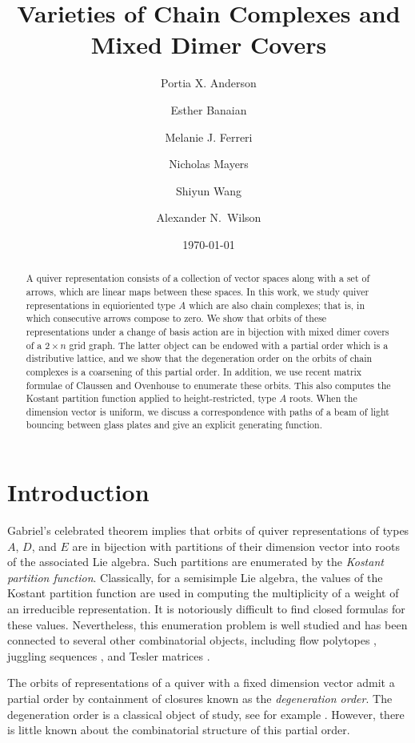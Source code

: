 \documentclass{amsart}
\title{Varieties of Chain Complexes and Mixed Dimer Covers}
\author{}
\date{\today}
\author[Anderson]{Portia X. Anderson}
\author[Banaian]{Esther Banaian}
\author[Ferreri]{Melanie J. Ferreri}
\author[Mayers]{Nicholas Mayers}
\author[Wang]{Shiyun Wang}
\author[Wilson]{Alexander N.~Wilson}
\theoremstyle{definition}
\begin{document}
\maketitle
\begin{abstract}
    A quiver representation consists of a collection of vector spaces along with a set of arrows, which are linear maps between these spaces. In this work, we study quiver representations in equioriented type $A$ which are also chain complexes; that is, in which consecutive arrows compose to zero. We show that orbits of these representations under a change of basis action are in bijection with mixed dimer covers of a $2 \times n$ grid graph. The latter object can be endowed with a partial order which is a distributive lattice, and we show that the degeneration order on the orbits of chain complexes is a coarsening of this partial order. In addition, we use recent matrix formulae of Claussen and Ovenhouse to enumerate these orbits. This also computes the Kostant partition function  applied to height-restricted, type $A$ roots. When the dimension vector is uniform, we discuss a correspondence with paths of a beam of light bouncing between glass plates and give an explicit generating function.
\end{abstract}

\section{Introduction}
Gabriel's celebrated theorem implies that orbits of quiver representations of types $A$, $D$, and $E$ are in bijection with partitions of their dimension vector into roots of the associated Lie algebra. Such partitions are enumerated by the \emph{Kostant partition function}.  Classically, for a semisimple Lie algebra, the values of the Kostant partition function are used in computing the multiplicity of a weight of an irreducible representation. It is notoriously difficult to find closed formulas for these values. Nevertheless,  this enumeration problem is well studied and has been connected to several other combinatorial objects, including 
flow polytopes \cite{baldonivergne2008}, juggling sequences \cite{benedetti2020kostant}, 
and Tesler matrices \cite{dmtcs:2475}. 

The orbits of representations of a quiver with a fixed dimension vector admit a partial order by containment of closures known as the \emph{degeneration order}. 
The degeneration order is a classical object of study, see for example 
\cite{abeasis1985degenerationsD, abeasis1985degenerations, Riedtmann}. 
However, there is little known about the combinatorial structure of this partial order. 
\end{document}
